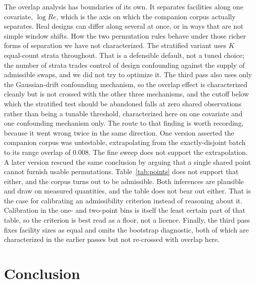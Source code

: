 \documentclass[journal=dce]{CUP-JNL-DTM}%
\begin{document}
The overlap analysis has boundaries of its own. It separates facilities along one covariate, $\log Re$, which is the axis on which the companion corpus actually separates. Real designs can differ along several at once, or in ways that are not simple window shifts. How the two permutation rules behave under those richer forms of separation we have not characterized. The stratified variant uses $K$ equal-count strata throughout. That is a defensible default, not a tuned choice; the number of strata trades control of design confounding against the supply of admissible swaps, and we did not try to optimize it. The third pass also uses only the Gaussian-drift confounding mechanism, so the overlap effect is characterized cleanly but is not crossed with the other three mechanisms, and the cutoff below which the stratified test should be abandoned falls at zero shared observations rather than being a tunable threshold, characterized here on one covariate and one confounding mechanism only. The route to that finding is worth recording, because it went wrong twice in the same direction. One version asserted the companion corpus was untestable, extrapolating from the exactly-disjoint batch to its range overlap of 0.008. The fine sweep does not support the extrapolation. A later version rescued the same conclusion by arguing that a single shared point cannot furnish usable permutations. Table~\ref{tab:points} does not support that either, and the corpus turns out to be admissible. Both inferences are plausible and draw on measured quantities, and the table does not bear out either. That is the case for calibrating an admissibility criterion instead of reasoning about it. Calibration in the one- and two-point bins is itself the least certain part of that table, so the criterion is best read as a floor, not a licence. Finally, the third pass fixes facility sizes as equal and omits the bootstrap diagnostic, both of which are characterized in the earlier passes but not re-crossed with overlap here.

\section{Conclusion}
\end{document}

